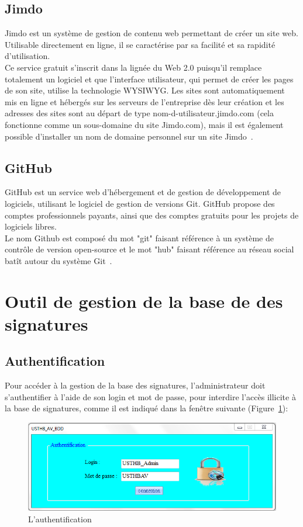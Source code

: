 \subsection{Jimdo}
Jimdo est un système de gestion de contenu web permettant de créer un site web. Utilisable directement en ligne, il se caractérise par sa facilité et sa rapidité d'utilisation.\\

Ce service gratuit s'inscrit dans la lignée du Web 2.0 puisqu'il remplace totalement un logiciel et que l'interface utilisateur, qui permet de créer les pages de son site, utilise la technologie WYSIWYG. Les sites sont automatiquement mis en ligne et hébergés sur les serveurs de l'entreprise dès leur création et les adresses des sites sont au départ de type nom-d-utilisateur.jimdo.com (cela fonctionne comme un sous-domaine du site Jimdo.com), mais il est également possible d'installer un nom de domaine personnel sur un site Jimdo~\cite{jimd}.
\subsection{GitHub}
GitHub est un service web d'hébergement et de gestion de développement de logiciels, utilisant le logiciel de gestion de versions Git. GitHub propose des comptes professionnels payants, ainsi que des comptes gratuits pour les projets de logiciels libres.\\

Le nom Github est composé du mot "git" faisant référence à un système de contrôle de version open-source et le mot "hub" faisant référence au réseau social batît autour du système Git~\cite{git}.
\section{Outil de gestion de la base de des signatures }
\subsection{Authentification}
Pour accéder à la gestion de la base des signatures, l'administrateur doit s'authentifier à l'aide de son login et mot de passe, pour interdire l'accès illicite à la base de signatures, comme il est indiqué dans la fenêtre suivante (Figure~\ref{fig :auth}):
\begin{figure}[H]
\begin{center}
\includegraphics[scale=0.6]{Figures/auth.png}
\caption{L'authentification}
\label{fig :auth} 
\end{center}
\end{figure}

